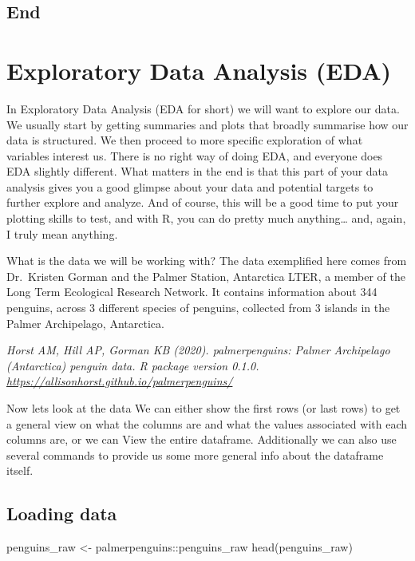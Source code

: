 \documentclass[
]{book}
\newenvironment{Shaded}{\begin{snugshade}}{\end{snugshade}}
\newcommand{\FunctionTok}[1]{\textcolor[rgb]{0.00,0.00,0.00}{#1}}
\newcommand{\NormalTok}[1]{#1}
\newcommand{\OtherTok}[1]{\textcolor[rgb]{0.56,0.35,0.01}{#1}}
\newcommand{\SpecialCharTok}[1]{\textcolor[rgb]{0.00,0.00,0.00}{#1}}
\begin{document}
\hypertarget{end}{%
\section{End}\label{end}}

\hypertarget{exploratory-data-analysis-eda}{%
\chapter{Exploratory Data Analysis (EDA)}\label{exploratory-data-analysis-eda}}

In Exploratory Data Analysis (EDA for short) we will want to explore our data.
We usually start by getting summaries and plots that broadly summarise how our data is structured.
We then proceed to more specific exploration of what variables interest us.
There is no right way of doing EDA, and everyone does EDA slightly different.
What matters in the end is that this part of your data analysis gives you a good glimpse about your data and potential targets to further explore and analyze.
And of course, this will be a good time to put your plotting skills to test, and with R, you can do pretty much anything\ldots{} and, again, I truly mean anything.

What is the data we will be working with?
The data exemplified here comes from Dr.~Kristen Gorman and the Palmer Station, Antarctica LTER, a member of the Long Term Ecological Research Network.
It contains information about 344 penguins, across 3 different species of penguins, collected from 3 islands in the Palmer Archipelago, Antarctica.

\emph{Horst AM, Hill AP, Gorman KB (2020). palmerpenguins: Palmer Archipelago (Antarctica) penguin data. R package version 0.1.0. \url{https://allisonhorst.github.io/palmerpenguins/}}

Now lets look at the data We can either show the first rows (or last rows) to get a general view on what the columns are and what the values associated with each columns are, or we can View the entire dataframe.
Additionally we can also use several commands to provide us some more general info about the dataframe itself.

\hypertarget{loading-data}{%
\section{Loading data}\label{loading-data}}

\begin{Shaded}
\begin{Highlighting}[]
\NormalTok{penguins\_raw }\OtherTok{\textless{}{-}}\NormalTok{ palmerpenguins}\SpecialCharTok{::}\NormalTok{penguins\_raw}
\FunctionTok{head}\NormalTok{(penguins\_raw)}
\end{Highlighting}
\end{Shaded}
\end{document}
